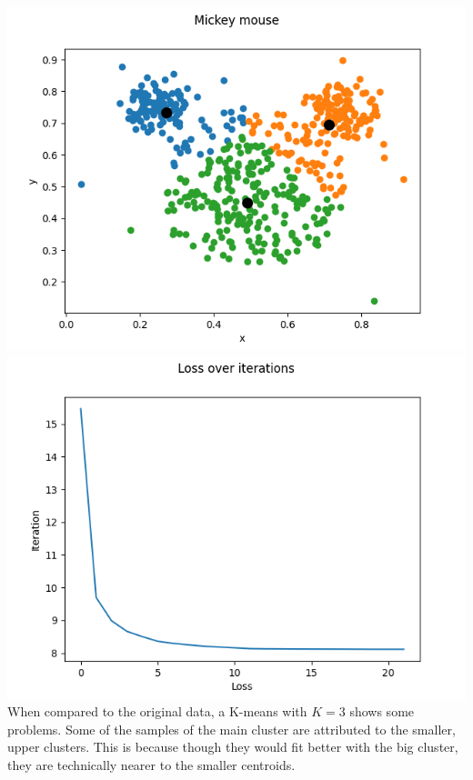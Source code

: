     \includegraphics[width=\textwidth / 2]{plots/mickey_k3}
    \includegraphics[width=\textwidth / 2]{plots/mickey_k3_loss} \\
    When compared to the original data, a K-means with $K=3$ shows some problems.
    Some of the samples of the main cluster are attributed to the smaller, upper clusters.
    This is because though they would fit better with the big cluster, they are technically nearer to the smaller centroids.

